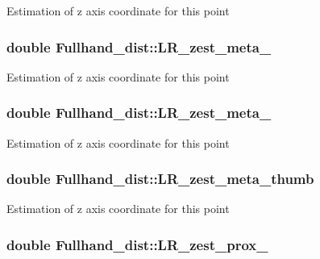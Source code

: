 Estimation of z axis coordinate for this point \hypertarget{classFullhand__dist_a2db68e1d8908b2e884da92a2683c1485}{
\subsubsection[{LR\_\-zest\_\-meta\_\-3}]{\setlength{\rightskip}{0pt plus 5cm}double {\bf Fullhand\_\-dist::LR\_\-zest\_\-meta\_}}}
\label{classFullhand__dist_a2db68e1d8908b2e884da92a2683c1485}
Estimation of z axis coordinate for this point \hypertarget{classFullhand__dist_a1a3268224fae796baa8e728de4de63cf}{
\subsubsection[{LR\_\-zest\_\-meta\_\-4}]{\setlength{\rightskip}{0pt plus 5cm}double {\bf Fullhand\_\-dist::LR\_\-zest\_\-meta\_}}}
\label{classFullhand__dist_a1a3268224fae796baa8e728de4de63cf}
Estimation of z axis coordinate for this point \hypertarget{classFullhand__dist_ac39e5d049f68614aebed907099025a11}{
\subsubsection[{LR\_\-zest\_\-meta\_\-thumb}]{\setlength{\rightskip}{0pt plus 5cm}double {\bf Fullhand\_\-dist::LR\_\-zest\_\-meta\_\-thumb}}}
\label{classFullhand__dist_ac39e5d049f68614aebed907099025a11}
Estimation of z axis coordinate for this point \hypertarget{classFullhand__dist_a932ad52d1a05c1f656e8bd1e70ed74ae}{
\subsubsection[{LR\_\-zest\_\-prox\_\-1}]{\setlength{\rightskip}{0pt plus 5cm}double {\bf Fullhand\_\-dist::LR\_\-zest\_\-prox\_}}}
\label{classFullhand__dist_a932ad52d1a05c1f656e8bd1e70ed74ae}
